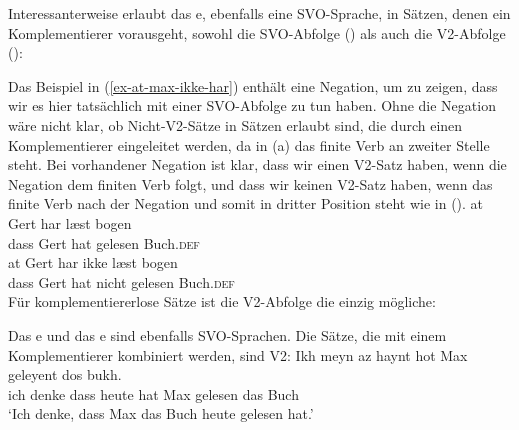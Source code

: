 \noindent
Interessanterweise erlaubt das e, ebenfalls eine SVO-Sprache, in Sätzen, denen ein Komplementierer vorausgeht, sowohl die SVO-Abfolge () als auch die V2-Abfolge ():
\z

\eal
{}
\zl
Das Beispiel in (\ref{ex-at-max-ikke-har}) enthält eine Negation, um zu zeigen, dass wir es hier tatsächlich
mit einer SVO-Abfolge zu tun haben. Ohne die Negation wäre nicht klar, ob Nicht-V2-Sätze in
Sätzen erlaubt sind, die durch einen Komplementierer eingeleitet werden, da in (a) das finite Verb an zweiter
Stelle steht. Bei vorhandener Negation ist klar, dass wir einen V2-Satz haben, wenn die Negation dem
finiten Verb folgt, und dass wir keinen V2-Satz haben, wenn das finite Verb nach der Negation und
somit in dritter Position steht wie in ().
\eal
\settowidth{}
\ex
\gll at Gert har læst bogen\\
     dass Gert hat gelesen Buch.\textsc{def}\\
\ex
\gll at Gert har ikke læst bogen\\
     dass Gert hat nicht gelesen Buch.\textsc{def}\\
\zl
Für komplementiererlose Sätze ist die V2-Abfolge die einzig mögliche:
\eal
\settowidth{}
\zl

\noindent
Das e und das e sind ebenfalls SVO-Sprachen. Die Sätze, die mit einem
Komplementierer kombiniert werden, sind V2:
\eal
\ex
\gll Ikh meyn  az   haynt hot Max geleyent dos bukh.\footnotemark\\
     ich denke dass heute hat Max gelesen das Buch\\\yiddish
{}
\glt `Ich denke, dass Max das Buch heute gelesen hat.'

